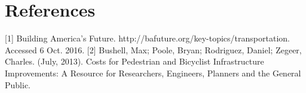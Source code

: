 
\section{References}
\label{sec:references}
[1] Building America's Future. http://bafuture.org/key-topics/transportation. Accessed 6 Oct. 2016.
[2] Bushell, Max; Poole, Bryan; Rodriguez, Daniel; Zegeer, Charles. (July, 2013). Costs for Pedestrian and Bicyclist Infrastructure Improvements: A Resource for Researchers, Engineers, Planners and the General Public.